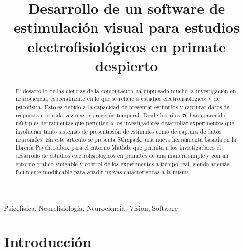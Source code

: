 \documentclass[conference]{IEEEtran}
\begin{document}
\title{Desarrollo de un software de estimulación visual para estudios electrofisiológicos en primate
despierto\\
}

\author{
{}
}

\maketitle

\begin{abstract}

El desarrollo de las ciencias de la computación ha impulsado mucho la investigación en neurociencia, especialmente en lo que se refiere a estudios electrofisiológicos y de psicofísica. Esto es debido a la capacidad de presentar estímulos y capturar datos de respuesta con cada vez mayor precisión temporal. Desde los años 70 han aparecido múltiples herramientas que permiten a los investigadores desarrollar experimentos que involucran tanto sistemas de presentación de estímulos como de captura de datos neuronales. En este artículo se presenta Stimpack, una nueva herramienta basada en la librería Psychtoolbox para el entorno Matlab, que permita a los investigadores el desarrollo de estudios electrofisiológicos en primates de una manera simple y con un entorno gráfico amigable y control de los experimentos a tiempo real, siendo además fácilmente modificable para añadir nuevas características a la misma. 

\end{abstract}
\begin{IEEEkeywords}
Psicofísica, Neurofisiología, Neurociencia, Vision, Software
\end{IEEEkeywords}

\section{Introducción}
\end{document}
